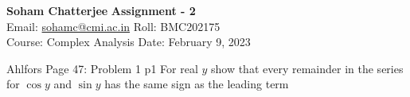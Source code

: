\documentclass[a4paper, 11pt]{article}
\begin{document}
	
	
	\textsf{\noindent \large\textbf{Soham Chatterjee} \hfill \textbf{Assignment - 2}\\
		Email: \href{sohamc@cmi.ac.in}{sohamc@cmi.ac.in} \hfill Roll: BMC202175\\
		\normalsize Course: Complex Analysis \hfill Date: February 9, 2023}
	
	
	\begin{problem}{%
			Ahlfors Page 47: Problem 1
		}{p1%
		}
	For real $y$ show that every remainder in the series for $\cos y$ and $\sin y$ has the same sign as the leading term
	\end{problem}
	
\end{document}
